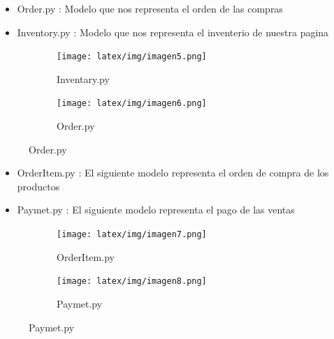 \documentclass{article}
\begin{document}
    \newpage
    \begin{itemize}		
		\item Order.py : Modelo que nos representa el orden de las compras
            \item Inventory.py : Modelo que nos representa el inventerio de nuestra pagina
	\end{itemize}
         \begin{figure}[h]
        \begin{subfigure}{0.5\textwidth}
            \centering
            \texttt{[image: latex/img/imagen5.png]}
            \caption{Inventary.py}
            \label{fig:primer}
        \end{subfigure}
        \begin{subfigure}{0.5\textwidth}
            \centering
            \texttt{[image: latex/img/imagen6.png]}
            \caption{Order.py}
            \label{fig:primer}
        \end{subfigure}
    \end{figure}
    \begin{itemize}		
		\item OrderItem.py : El siguiente modelo representa el orden de compra de los productos
            \item Paymet.py : El siguiente modelo representa el pago de las ventas
	\end{itemize}
         \begin{figure}[h]
        \begin{subfigure}{0.5\textwidth}
            \centering
            \texttt{[image: latex/img/imagen7.png]}
            \caption{OrderItem.py}
            \label{fig:primer}
        \end{subfigure}
        \begin{subfigure}{0.5\textwidth}
            \centering
            \texttt{[image: latex/img/imagen8.png]}
            \caption{Paymet.py}
            \label{fig:primer}
        \end{subfigure}
    \end{figure}
    \newpage
\end{document}
